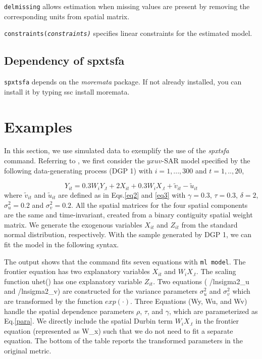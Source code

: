 \hangpara
{\tt delmissing} allows estimation  when missing values are present by  removing the corresponding units from spatial matrix. 

\hangpara
{\tt constraints(\it constraints)}  specifies linear constraints for the estimated model. 


\subsection{Dependency of spxtsfa}
{\tt spxtsfa} depends on the {\it moremata }package. If not already installed, you can install it by typing ssc install moremata.


\section{Examples}\label{sec_example}
In this section, we use simulated data to  exemplify the use of the \textit{spxtsfa} command.  Referring to  \cite{galli2022spatial}, we first consider the $yxuv$-SAR model specified by the following data-generating process (DGP 1) with $i=1,...,300$ and $t=1,..,20$,

\begin{equation}\label{dgp1}
	Y_{it} = 0.3W_{i}Y_{.t}+2X_{it}+ 0.3W_{i}X_{.t}  + \tilde{v}_{it}-\tilde{u}_{it}
\end{equation}
where $\tilde{v}_{it}$ and $\tilde{u}_{it}$ are defined as in Eqs.\eqref{eq2} and \eqref{eq3} with $\gamma=0.3$, $\tau=0.3$, $\delta=2$, $\sigma_{u}^2=0.2$ and $\sigma_v^2 =0.2$. All the spatial matrices for the four spatial components are the same and time-invariant, created from a binary contiguity spatial weight matrix. We generate the exogenous variables $X_{it}$ and $Z_{it}$ from the standard normal distribution, respectively. With the sample generated by DGP 1, we can fit the model in the following syntax.

\begin{stlog}
	
\end{stlog}

The output shows that the command fits seven equations with {\tt ml model}. The frontier equation has two explanatory variables $X_{it}$ and $W_iX_{.t}$. The scaling function uhet() has one explanatory variable $Z_{it}$.  Two equations ( /lnsigma2\_u and /lnsigma2\_v) are constructed for the variance parameters $\sigma_u^2$ and $\sigma_v^2$ which are transformed by the function $exp(\cdot)$. Three Equations (Wy, Wu, and Wv) handle the spatial dependence parameters $\rho$, $\tau$, and $\gamma$, which are parameterized as Eq.\eqref{para}. We directly include the spatial Durbin term $W_iX_{.t}$ in the frontier equation  (represented as W\_x) such that we do not need to fit a separate equation.  The bottom of the table reports the transformed parameters in the original metric.

